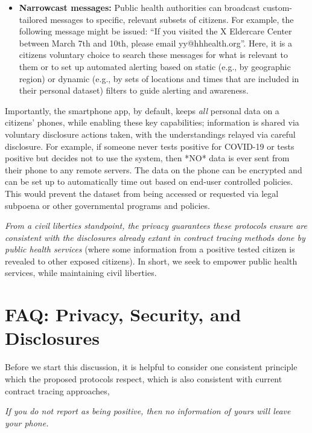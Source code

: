\documentclass{article}
\begin{document}
\begin{itemize}
\item \textbf{Narrowcast messages:}  Public health authorities can broadcast
  custom-tailored messages to specific, relevant subsets of citizens.  For example, the following message might be issued: ``If you visited
  the X Eldercare Center between March 7th and 10th, please email yy@hhhealth.org''.  Here, it is a citizens voluntary choice to search these messages for what is relevant to them or to set up automated alerting based on static (e.g., by geographic region) or dynamic (e.g., by sets of locations and times that are included in their personal dataset) filters to guide alerting and awareness.
  
\end{itemize}

Importantly, the smartphone app, by default, keeps \emph{all} personal data on a citizens' phones, while enabling these key capabilities; information is shared via voluntary disclosure actions taken, with the understandings relayed via careful disclosure. For example, if someone never tests positive for COVID-19 or tests positive but decides not to use the system, then *NO* data is ever sent from their phone to any remote servers. The data on the phone can be encrypted and can be set up to automatically time out based on end-user controlled policies.  This would prevent the dataset from being accessed or requested via legal subpoena or other governmental programs and policies.

\emph{From a civil liberties standpoint, the privacy guarantees these protocols ensure are consistent with the disclosures already extant in contract tracing methods done by public health services} (where some information from a positive tested citizen is revealed to other exposed citizens). In short, we seek to empower public health services, while maintaining civil liberties.
 
\section{FAQ: Privacy, Security, and Disclosures} \label{sect:FAQ}

Before we start this discussion, it is helpful to consider one consistent principle which the proposed protocols respect, which is also consistent with current contract tracing approaches,

\begin{center}
\emph{If you do not report as being positive, then no information of yours will leave your phone.}
\end{center}
\end{document}
